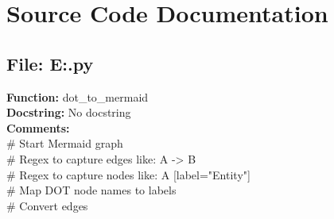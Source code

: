 \section*{Source Code Documentation}

\subsection*{File: E:\project\capstone\frontend\dotcoverter.py}
\textbf{Function:} dot_to_mermaid\\
\textbf{Docstring:} No docstring\\
\textbf{Comments:}\\
# Start Mermaid graph\\
# Regex to capture edges like: A -> B\\
# Regex to capture nodes like: A [label="Entity"]\\
# Map DOT node names to labels\\
# Convert edges\\
